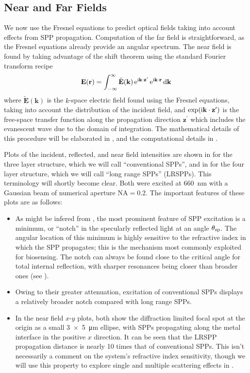 \subsection{Near and Far Fields} \label{sec:fresnelnearfar}
We now use the Fresnel equations to predict optical fields taking into
account effects from SPP propagation.  Computation of the far field is
straightforward, as the Fresnel equations already provide an angular
spectrum.  The near field is found by taking advantage of the shift theorem
using the standard Fourier transform recipe
\begin{equation}
\mathbf{E}(\mathbf{r}) = \int_{-\infty}^{\infty} \tilde{\mathbf{E}}(\mathbf{k})
\,{\mathrm{e}}^{{\mathrm{i}} \mathbf{k} \cdot \mathbf{z}^\prime}
\,{\mathrm{e}}^{{\mathrm{i}} \mathbf{k} \cdot \mathbf{r}}\,\mathrm{d} \mathbf{k}
\end{equation}
where $\tilde{\mathbf{E}}(\mathbf{k})$ is the $k$-space electric field
found using the Fresnel equations, taking into account the distribution of
the incident field, and $\exp({\mathrm{i}} \mathbf{k} \cdot
\mathbf{z}^\prime)$ is the free-space transfer function along the 
propagation direction $\mathbf{z}^\prime$ which includes the evanescent
wave due to the domain of integration.  The mathematical details of this procedure
will be elaborated in , and the
computational details in .

Plots of the incident, reflected, and near field intensities are shown in
 for the three layer structure, which we
will call ``conventional SPPs'', and in 
for the four layer structure, which we will call ``long range SPPs''
(LRSPPs).  This terminology will shortly become clear.  Both were excited
at \SI{660}{\nano\meter} with a Gaussian beam of numerical aperture
$\mathrm{NA}=0.2$.  The important features of these plots are as follows:
\begin{itemize}
\item As might be infered from ,
the most prominent feature of SPP excitation is a minimum, or ``notch'' in
the specularly reflected light at an angle $\theta_\mathrm{sp}$.  The angular
location of this minimum is highly sensitive to the refractive index in
which the SPP propagates; this is the mechanism most commonly exploited for
biosensing.  The notch can always be found close to the critical
angle for total internal reflection, with sharper resonances being closer
than broader ones (see ).
\item Owing to their greater attenuation, excitation of conventional SPPs
displays a relatively broader notch compared with long range SPPs.
\item In the near field $x$-$y$ plots, both show the diffraction limited
focal spot at the origin as a small \SI{3x5}{\micro\meter} ellipse, with
SPPs propagating along the metal interface in the positive $x$ direction.
It can be seen that the LRSPP propagation distance is nearly 10 times that
of conventional SPPs.  This isn't necessarily a comment on the system's
refractive index sensitivity, though we will use this property to explore
single and multiple scattering effects in .
\end{itemize}

